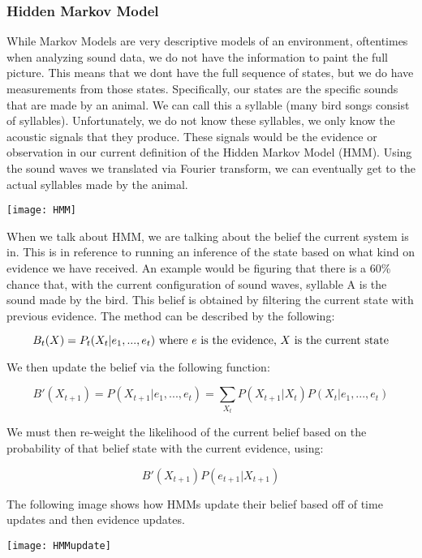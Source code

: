 \subsubsection{Hidden Markov Model}
While Markov Models are very descriptive models of an environment, oftentimes when analyzing sound data, we do not have the information to paint the full picture. This means that we don\textquotesingle t have the full sequence of states, but we do have measurements from those states. Specifically, our states are the specific sounds that are made by an animal. We can call this a syllable (many bird songs consist of syllables). Unfortunately, we do not know these syllables, we only know the acoustic signals that they produce. These signals would be the evidence or observation in our current definition of the Hidden Markov Model (HMM). Using the sound waves we translated via Fourier transform, we can eventually get to the actual syllables made by the animal.\par

\begin{center}
  \texttt{[image: HMM]}
\end{center}

When we talk about HMM, we are talking about the belief the current system is in. This is in reference to running an inference of the state based on what kind on evidence we have received. An example would be figuring that there is a 60\% chance that, with the current configuration of sound waves, syllable A is the sound made by the bird. This belief is obtained by filtering the current state with previous evidence. The method can be described by the following:\par

\begin{equation}
  B_{t}(X)
  = P_{t}(X_{t} | e_{1}, ..., e_{t})
  \textnormal{ where } e \textnormal{ is the evidence, }
  X \textnormal{ is the current state}
\end{equation}

We then update the belief via the following function:\par

\begin{equation}
  B'(X_{t+1})
  = P(X_{t+1} | e_{1}, ..., e_{t})
  = \sum_{X_{t}} P(X_{t+1} | X_{t}) P(X_{t} | e_{1}, ..., e_{t})
\end{equation}

We must then re-weight the likelihood of the current belief based on the probability of that belief state with the current evidence, using:

\begin{equation}
  B'(X_{t+1}) P(e_{t+1} | X_{t+1})
\end{equation}

The following image shows how HMM\textquotesingle s update their belief based off of time updates and then evidence updates.

\begin{center}
  \texttt{[image: HMMupdate]}
\end{center}
